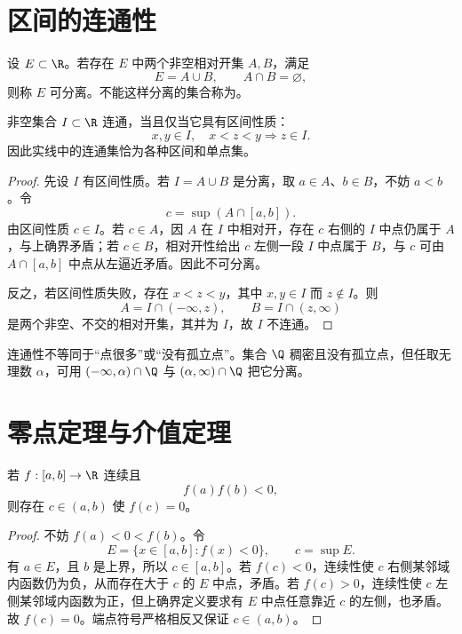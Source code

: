 \section{区间的连通性}

\begin{definition}[相对分离与连通]
设 \(E\subset\R\)。若存在 \(E\) 中两个非空相对开集 \(A,B\)，满足
\[
 E=A\cup B,\qquad A\cap B=\varnothing,
\]
则称 \(E\) 可分离。不能这样分离的集合称为。
\end{definition}

\begin{theorem}[实线连通集的刻画]
非空集合 \(I\subset\R\) 连通，当且仅当它具有区间性质：
\[
 x,y\in I,\quad x<z<y\Longrightarrow z\in I.
\]
因此实线中的连通集恰为各种区间和单点集。
\end{theorem}

\begin{proof}
先设 \(I\) 有区间性质。若 \(I=A\cup B\) 是分离，取 \(a\in A\)、\(b\in B\)，不妨 \(a<b\)。令
\[
 c=\sup(A\cap[a,b]).
\]
由区间性质 \(c\in I\)。若 \(c\in A\)，因 \(A\) 在 \(I\) 中相对开，存在 \(c\) 右侧的 \(I\) 中点仍属于 \(A\)，与上确界矛盾；若 \(c\in B\)，相对开性给出 \(c\) 左侧一段 \(I\) 中点属于 \(B\)，与 \(c\) 可由 \(A\cap[a,b]\) 中点从左逼近矛盾。因此不可分离。

反之，若区间性质失败，存在 \(x<z<y\)，其中 \(x,y\in I\) 而 \(z\notin I\)。则
\[
 A=I\cap(-\infty,z),\qquad B=I\cap(z,\infty)
\]
是两个非空、不交的相对开集，其并为 \(I\)，故 \(I\) 不连通。
\end{proof}

\begin{remark}
连通性不等同于“点很多”或“没有孤立点”。集合 \(\Q\) 稠密且没有孤立点，但任取无理数 \(\alpha\)，可用 \((-\infty,\alpha)\cap\Q\) 与 \((\alpha,\infty)\cap\Q\) 把它分离。
\end{remark}

\section{零点定理与介值定理}

\begin{theorem}
若 \(f:[a,b]\to\R\) 连续且
\[
 f(a)f(b)<0,
\]
则存在 \(c\in(a,b)\) 使 \(f(c)=0\)。
\end{theorem}

\begin{proof}
不妨 \(f(a)<0<f(b)\)。令
\[
 E=\{x\in[a,b]:f(x)<0\},\qquad c=\sup E.
\]
有 \(a\in E\)，且 \(b\) 是上界，所以 \(c\in[a,b]\)。若 \(f(c)<0\)，连续性使 \(c\) 右侧某邻域内函数仍为负，从而存在大于 \(c\) 的 \(E\) 中点，矛盾。若 \(f(c)>0\)，连续性使 \(c\) 左侧某邻域内函数为正，但上确界定义要求有 \(E\) 中点任意靠近 \(c\) 的左侧，也矛盾。故 \(f(c)=0\)。端点符号严格相反又保证 \(c\in(a,b)\)。
\end{proof}

